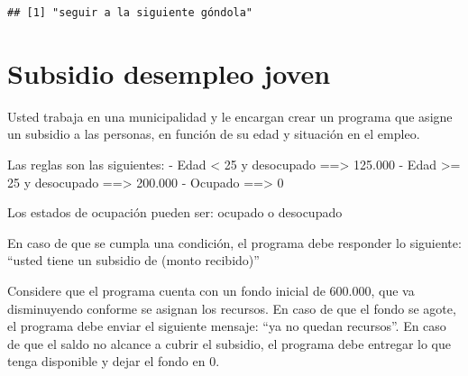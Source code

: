 \documentclass[
]{article}
\begin{document}
\begin{verbatim}
## [1] "seguir a la siguiente góndola"
\end{verbatim}

\hypertarget{subsidio-desempleo-joven}{%
\section{Subsidio desempleo joven}\label{subsidio-desempleo-joven}}

Usted trabaja en una municipalidad y le encargan crear un programa que
asigne un subsidio a las personas, en función de su edad y situación en
el empleo.

Las reglas son las siguientes: - Edad \textless{} 25 y desocupado
==\textgreater{} 125.000 - Edad \textgreater= 25 y desocupado
==\textgreater{} 200.000 - Ocupado ==\textgreater{} 0

Los estados de ocupación pueden ser: ocupado o desocupado

En caso de que se cumpla una condición, el programa debe responder lo
siguiente: ``usted tiene un subsidio de (monto recibido)''

Considere que el programa cuenta con un fondo inicial de 600.000, que va
disminuyendo conforme se asignan los recursos. En caso de que el fondo
se agote, el programa debe enviar el siguiente mensaje: ``ya no quedan
recursos''. En caso de que el saldo no alcance a cubrir el subsidio, el
programa debe entregar lo que tenga disponible y dejar el fondo en 0.
\end{document}
